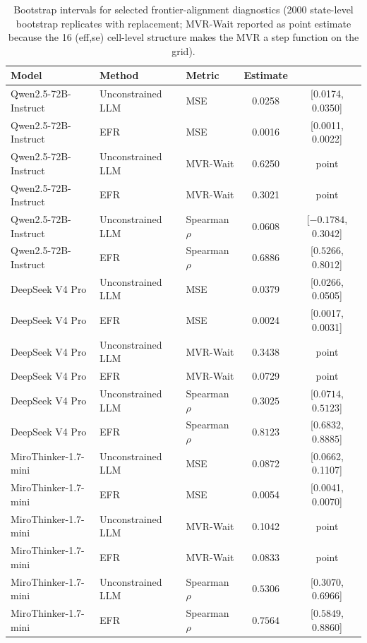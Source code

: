 \documentclass[11pt]{article}
\begin{document}
\begin{table}[t]
\centering
\caption{Bootstrap intervals for selected frontier-alignment diagnostics (2000 state-level bootstrap replicates with replacement; MVR-Wait reported as point estimate because the 16 (eff,se) cell-level structure makes the MVR a step function on the grid).}
\label{tab:S13}
\small
\setlength{\tabcolsep}{6pt}
\begin{tabular}{l l l c c}
\toprule
Model & Method & Metric & Estimate \\
\midrule
Qwen2.5-72B-Instruct & Unconstrained LLM & MSE & 0.0258 & [0.0174, 0.0350] \\
Qwen2.5-72B-Instruct & EFR & MSE & 0.0016 & [0.0011, 0.0022] \\
\midrule
Qwen2.5-72B-Instruct & Unconstrained LLM & MVR-Wait & 0.6250 & point \\
Qwen2.5-72B-Instruct & EFR & MVR-Wait & 0.3021 & point \\
\midrule
Qwen2.5-72B-Instruct & Unconstrained LLM & Spearman \(\rho\) & $0.0608$ & [$-0.1784$, $0.3042$] \\
Qwen2.5-72B-Instruct & EFR & Spearman \(\rho\) & $0.6886$ & [$0.5266$, $0.8012$] \\
\midrule
DeepSeek V4 Pro & Unconstrained LLM & MSE & 0.0379 & [0.0266, 0.0505] \\
DeepSeek V4 Pro & EFR & MSE & 0.0024 & [0.0017, 0.0031] \\
\midrule
DeepSeek V4 Pro & Unconstrained LLM & MVR-Wait & 0.3438 & point \\
DeepSeek V4 Pro & EFR & MVR-Wait & 0.0729 & point \\
\midrule
DeepSeek V4 Pro & Unconstrained LLM & Spearman \(\rho\) & $0.3025$ & [$0.0714$, $0.5123$] \\
DeepSeek V4 Pro & EFR & Spearman \(\rho\) & $0.8123$ & [$0.6832$, $0.8885$] \\
\midrule
MiroThinker-1.7-mini & Unconstrained LLM & MSE & 0.0872 & [0.0662, 0.1107] \\
MiroThinker-1.7-mini & EFR & MSE & 0.0054 & [0.0041, 0.0070] \\
\midrule
MiroThinker-1.7-mini & Unconstrained LLM & MVR-Wait & 0.1042 & point \\
MiroThinker-1.7-mini & EFR & MVR-Wait & 0.0833 & point \\
\midrule
MiroThinker-1.7-mini & Unconstrained LLM & Spearman \(\rho\) & $0.5306$ & [$0.3070$, $0.6966$] \\
MiroThinker-1.7-mini & EFR & Spearman \(\rho\) & $0.7564$ & [$0.5849$, $0.8860$] \\
\bottomrule
\end{tabular}


\end{table}
\end{document}
